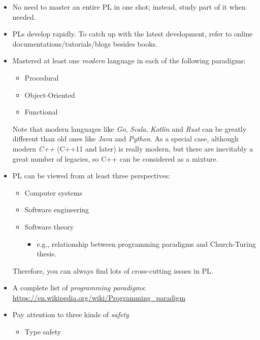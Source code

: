 \documentclass{article}
\begin{document}
        \begin{itemize}
            \item No need to master an entire PL in one shot; instead, study part of it when needed.
            \item PLs develop rapidly. To catch up with the latest development, refer to online documentations/tutorials/blogs besides books.
            \item Mastered at least one \emph{modern} language in each of the following paradigms:
            \begin{itemize}
                \item Procedural
                \item Object-Oriented
                \item Functional
            \end{itemize}
            Note that modern languages like \emph{Go}, \emph{Scala}, \emph{Kotlin} and \emph{Rust} can be greatly different than old ones like \emph{Java} and \emph{Python}.
            As a special case, although modern \emph{C++} (C++11 and later) is really modern, but there are inevitably a great number of legacies, so C++ can be considered as a mixture.
            \item PL can be viewed from at least three perspectives:
            \begin{itemize}
                \item Computer systems
                \item Software engineering
                \item Software theory
                \begin{itemize}
                    \item e.g., relationship between programming paradigms and Church-Turing thesis.
                \end{itemize}
            \end{itemize}
            Therefore, you can always find lots of cross-cutting issues in PL.
            \item A complete list of \emph{programming paradigms}:\\
            \href{https://en.wikipedia.org/wiki/Programming\_paradigm}{https://en.wikipedia.org/wiki/Programming\_paradigm}
            \item Pay attention to three kinds of \emph{safety}
            \begin{itemize}
                \item Type safety

\end{itemize}
\end{itemize}
\end{document}

